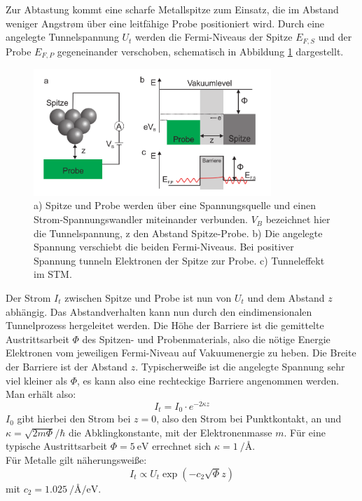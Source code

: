 Zur Abtastung kommt eine scharfe Metallspitze zum Einsatz, die im Abstand weniger
Angstrøm über eine leitfähige Probe positioniert wird. Durch eine angelegte 
Tunnelspannung $U_t$ werden die Fermi-Niveaus der Spitze $E_{F,S}$ und der Probe
$E_{F,P}$ gegeneinander verschoben, schematisch in Abbildung \ref{tunnelstm} 
dargestellt.
\begin{figure}
    \centering
    \includegraphics[width=0.8\textwidth]{Abb/tunnel_stm.png}
    \caption{a) Spitze und Probe werden über eine Spannungsquelle und einen 
                Strom-Spannungswandler miteinander verbunden. $V_B$ bezeichnet
                hier die Tunnelspannung, z den Abstand Spitze-Probe.
             b) Die angelegte Spannung verschiebt die beiden Fermi-Niveaus. Bei 
                positiver Spannung tunneln Elektronen der Spitze zur Probe.
             c) Tunneleffekt im STM.
             \cite{hofmann}}
    \label{tunnelstm}
\end{figure}
Der Strom $I_t$ zwischen Spitze und Probe ist nun von $U_t$ und dem Abstand $z$ 
abhängig. Das Abstandverhalten kann nun durch den eindimensionalen Tunnelprozess
hergeleitet werden. Die Höhe der Barriere ist die gemittelte Austrittsarbeit $\Phi$
des Spitzen- und Probenmaterials, also die nötige Energie Elektronen vom jeweiligen
Fermi-Niveau auf Vakuumenergie zu heben. Die Breite der Barriere ist der Abstand $z$.
Typischerweiße ist die angelegte Spannung sehr viel kleiner als $\Phi$, es kann also
eine rechteckige Barriere angenommen werden. Man erhält also:
\[
    I_t = I_0 \cdot e^{-2\kappa z}    
\]
$I_0$ gibt hierbei den Strom bei $z=0$, also den Strom bei Punktkontakt, 
an und $\kappa = \sqrt{2m \Phi}/ \hbar$ die Abklingkonstante, mit
der Elektronenmasse $m$. Für eine typische Austrittsarbeit $\Phi = \SI{5}{\eV}$
errechnet sich $\kappa = \SI{1}{\per \angstrom}$.\\
Für Metalle gilt näherungsweiße:
\[
    I_t \propto U_t \exp(-c_2 \sqrt{\Phi} z)
\]
mit $c_2 = \SI{1,025}{\per\angstrom\per\eV}$.
\cite{schwabl,hofmann}

